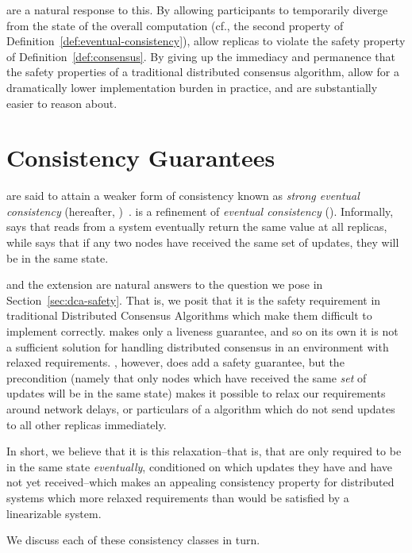 \CRDTs are a natural response to this. By allowing participants to temporarily
diverge from the state of the overall computation (cf., the second property of
Definition~\ref{def:eventual-consistency}), \CRDTs allow replicas to violate the
safety property of Definition~\ref{def:consensus}.  By giving up the immediacy
and permanence that the safety properties of a traditional distributed consensus
algorithm, \CRDTs allow for a dramatically lower implementation burden in
practice, and are substantially easier to reason about.

\section{Consistency Guarantees}
\CRDTs are said to attain a weaker form of consistency known as \emph{strong
eventual consistency} (hereafter, \SEC)~\citep{shapiro11}. \SEC is a refinement
of \emph{eventual consistency} (\EC). Informally, \EC says that reads from a
system eventually return the same value at all replicas, while \SEC says that if
any two nodes have received the same set of updates, they will be in the same
state.

\EC and the \SEC extension are natural answers to the question we pose in
Section~\ref{sec:dca-safety}. That is, we posit that it is the safety
requirement in traditional Distributed Consensus Algorithms which make them
difficult to implement correctly. \EC makes only a liveness guarantee, and so on
its own it is not a sufficient solution for handling distributed consensus in an
environment with relaxed requirements. \SEC, however, does add a safety
guarantee, but the precondition (namely that only nodes which have received the
same \emph{set} of updates will be in the same state) makes it possible to relax
our requirements around network delays, or particulars of a \CRDT algorithm
which do not send updates to all other replicas immediately.

In short, we believe that it is this relaxation--that is, that \CRDTs are only
required to be in the same state \emph{eventually}, conditioned on which updates
they have and have not yet received--which makes \SEC an appealing consistency
property for distributed systems which more relaxed requirements than would be
satisfied by a linearizable system.

We discuss each of these consistency classes in turn.

